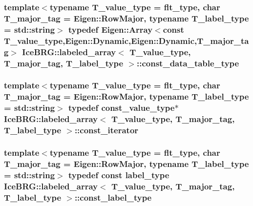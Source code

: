 \subsubsection[{const\+\_\+data\+\_\+table\+\_\+type}]{\setlength{\rightskip}{0pt plus 5cm}template$<$typename T\+\_\+value\+\_\+type = flt\+\_\+type, char T\+\_\+major\+\_\+tag = Eigen\+::\+Row\+Major, typename T\+\_\+label\+\_\+type = std\+::string$>$ typedef Eigen\+::\+Array$<$const T\+\_\+value\+\_\+type,Eigen\+::\+Dynamic,Eigen\+::\+Dynamic,T\+\_\+major\+\_\+tag$>$ {\bf Ice\+B\+R\+G\+::labeled\+\_\+array}$<$ T\+\_\+value\+\_\+type, T\+\_\+major\+\_\+tag, T\+\_\+label\+\_\+type $>$\+::{\bf const\+\_\+data\+\_\+table\+\_\+type}}\label{classIceBRG_1_1labeled__array_a004378b6978779cae2c375a3a83001a2}
\hypertarget{classIceBRG_1_1labeled__array_ae50c667e3ccb32675f43d38b9132a212}{}
\subsubsection[{const\+\_\+iterator}]{\setlength{\rightskip}{0pt plus 5cm}template$<$typename T\+\_\+value\+\_\+type = flt\+\_\+type, char T\+\_\+major\+\_\+tag = Eigen\+::\+Row\+Major, typename T\+\_\+label\+\_\+type = std\+::string$>$ typedef {\bf const\+\_\+value\+\_\+type}$\ast$ {\bf Ice\+B\+R\+G\+::labeled\+\_\+array}$<$ T\+\_\+value\+\_\+type, T\+\_\+major\+\_\+tag, T\+\_\+label\+\_\+type $>$\+::{\bf const\+\_\+iterator}}\label{classIceBRG_1_1labeled__array_ae50c667e3ccb32675f43d38b9132a212}
\hypertarget{classIceBRG_1_1labeled__array_ae6050b70db84d1f34fefc241f46320f5}{}
\subsubsection[{const\+\_\+label\+\_\+type}]{\setlength{\rightskip}{0pt plus 5cm}template$<$typename T\+\_\+value\+\_\+type = flt\+\_\+type, char T\+\_\+major\+\_\+tag = Eigen\+::\+Row\+Major, typename T\+\_\+label\+\_\+type = std\+::string$>$ typedef const {\bf label\+\_\+type} {\bf Ice\+B\+R\+G\+::labeled\+\_\+array}$<$ T\+\_\+value\+\_\+type, T\+\_\+major\+\_\+tag, T\+\_\+label\+\_\+type $>$\+::{\bf const\+\_\+label\+\_\+type}}\label{classIceBRG_1_1labeled__array_ae6050b70db84d1f34fefc241f46320f5}
\hypertarget{classIceBRG_1_1labeled__array_acfa6b748c386d02309a161e84f02e59d}{}
